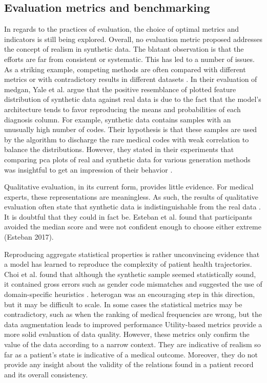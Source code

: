 \subsection{Evaluation metrics and benchmarking}
In regards to the practices of evaluation, the choice of optimal metrics and indicators is still being explored. Overall, no evaluation metric proposed addresses the concept of realism in synthetic data. The blatant observation is that the efforts are far from consistent or systematic. This has led to a number of issues. As a striking example, competing methods are often compared with different metrics or with contradictory results in different datasets \cite{baowaly_2019_IEEE,baowaly_2019_jamia,Camino2018-re,Choi2017-nt,Zhang2020}. In their evaluation of \gls{medgan}, Yale et al. argue that the positive resemblance of plotted feature distribution of synthetic data against real data is due to the fact that the model's architecture tends to favor reproducing the means and probabilities of each diagnosis column. For example, synthetic data contains samples with an unusually high number of codes. Their hypothesis is that these samples are used by the algorithm to discharge the rare medical codes with weak correlation to balance the distributions. However, they stated in their experiments that comparing \gls{pca} plots of real and synthetic data for various generation methods was insightful to get an impression of their behavior \cite{Yale_2020}.\par
Qualitative evaluation, in its current form, provides little evidence. For medical experts, these representations are meaningless. As such, the results of qualitative evaluation often state that synthetic data is indistinguishable from the real data \cite{Choi2017-nt,Wang_2019}. It is doubtful that they could in fact be. Esteban et al. found that participants avoided the median score and were not confident enough to choose either extreme (Esteban 2017).\par
Reproducing aggregate statistical properties is rather unconvincing evidence that a model has learned to reproduce the complexity of patient health trajectories. Choi et al. found that although the synthetic sample seemed statistically sound, it contained gross errors such as gender code mismatches and suggested the use of domain-specific heuristics \cite{Choi2017-nt}. \gls{heterogan} was an encouraging step in this direction, but it may be difficult to scale. In some cases the statistical metrics may be contradictory, such as when the ranking of medical frequencies are wrong, but the data augmentation leads to improved performance \cite{Che_2017}
Utility-based metrics provide a more solid evaluation of data quality. However, these metrics only confirm the value of the data according to a narrow context. They are indicative of realism so far as a patient's state is indicative of a medical outcome. Moreover, they do not provide any insight about the validity of the relations found in a patient record and its overall consistency. 


